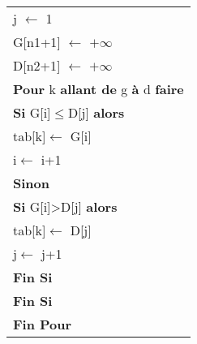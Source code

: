 \documentclass[10pt,fleqn]{article} %
\begin{document}
\begin{pseudo}
\begin{tabular}{p{}}
\hspace{.4cm} \textsf{j $\leftarrow$ 1}\\
\hspace{.4cm} \textsf{G[n1+1] $\leftarrow$ $+\infty$}\\
\hspace{.4cm} \textsf{D[n2+1] $\leftarrow$ $+\infty$}\\
\hspace{.4cm} \textbf{Pour} \textsf{k} \textbf{allant de} \textsf{g} \textbf{à} \textsf{d} \textbf{faire}\\
\hspace{.8cm} \textbf{Si}  \textsf{G[i]$\leq$D[j]} \textbf{alors} \\
\hspace{1.2cm} \textsf{tab[k]$\leftarrow$ G[i]} \\
\hspace{1.2cm} \textsf{i$\leftarrow$ i+1} \\
\hspace{.8cm} \textbf{Sinon} \\
\hspace{1.2cm} \textbf{Si} \textsf{G[i]>D[j]} \textbf{alors} \\
\hspace{1.6cm} \textsf{tab[k]$\leftarrow$ D[j]} \\
\hspace{1.6cm} \textsf{j$\leftarrow$ j+1} \\
\hspace{1.2cm} \textbf{Fin Si} \\
\hspace{.8cm} \textbf{Fin Si} \\
\hspace{.4cm}  \textbf{Fin Pour}\\
\hline
\end{tabular}

\end{pseudo}
\end{document}
